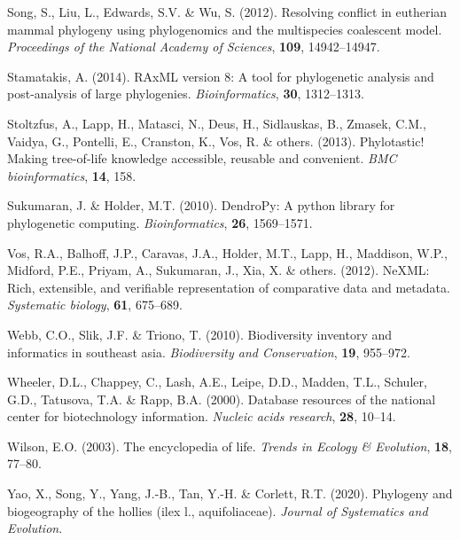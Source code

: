 \documentclass[]{article}
\begin{document}
\leavevmode\hypertarget{ref-song2012resolving}{}%
Song, S., Liu, L., Edwards, S.V. \& Wu, S. (2012). Resolving conflict in eutherian mammal phylogeny using phylogenomics and the multispecies coalescent model. \emph{Proceedings of the National Academy of Sciences}, \textbf{109}, 14942--14947.

\leavevmode\hypertarget{ref-stamatakis2014raxml}{}%
Stamatakis, A. (2014). RAxML version 8: A tool for phylogenetic analysis and post-analysis of large phylogenies. \emph{Bioinformatics}, \textbf{30}, 1312--1313.

\leavevmode\hypertarget{ref-stoltzfus2013phylotastic}{}%
Stoltzfus, A., Lapp, H., Matasci, N., Deus, H., Sidlauskas, B., Zmasek, C.M., Vaidya, G., Pontelli, E., Cranston, K., Vos, R. \& others. (2013). Phylotastic! Making tree-of-life knowledge accessible, reusable and convenient. \emph{BMC bioinformatics}, \textbf{14}, 158.

\leavevmode\hypertarget{ref-sukumaran2010dendropy}{}%
Sukumaran, J. \& Holder, M.T. (2010). DendroPy: A python library for phylogenetic computing. \emph{Bioinformatics}, \textbf{26}, 1569--1571.

\leavevmode\hypertarget{ref-vos2012nexml}{}%
Vos, R.A., Balhoff, J.P., Caravas, J.A., Holder, M.T., Lapp, H., Maddison, W.P., Midford, P.E., Priyam, A., Sukumaran, J., Xia, X. \& others. (2012). NeXML: Rich, extensible, and verifiable representation of comparative data and metadata. \emph{Systematic biology}, \textbf{61}, 675--689.

\leavevmode\hypertarget{ref-webb2010biodiversity}{}%
Webb, C.O., Slik, J.F. \& Triono, T. (2010). Biodiversity inventory and informatics in southeast asia. \emph{Biodiversity and Conservation}, \textbf{19}, 955--972.

\leavevmode\hypertarget{ref-wheeler2000database}{}%
Wheeler, D.L., Chappey, C., Lash, A.E., Leipe, D.D., Madden, T.L., Schuler, G.D., Tatusova, T.A. \& Rapp, B.A. (2000). Database resources of the national center for biotechnology information. \emph{Nucleic acids research}, \textbf{28}, 10--14.

\leavevmode\hypertarget{ref-wilson2003encyclopedia}{}%
Wilson, E.O. (2003). The encyclopedia of life. \emph{Trends in Ecology \& Evolution}, \textbf{18}, 77--80.

\leavevmode\hypertarget{ref-yao2020phylogeny}{}%
Yao, X., Song, Y., Yang, J.-B., Tan, Y.-H. \& Corlett, R.T. (2020). Phylogeny and biogeography of the hollies (ilex l., aquifoliaceae). \emph{Journal of Systematics and Evolution}.
\end{document}
